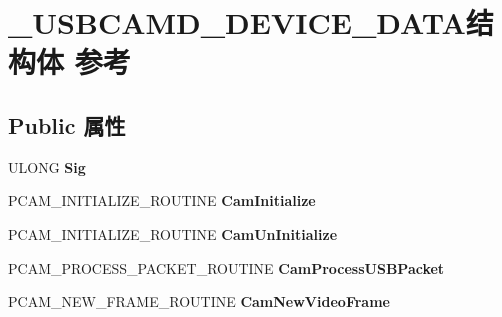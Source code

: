\hypertarget{struct___u_s_b_c_a_m_d___d_e_v_i_c_e___d_a_t_a}{}\section{\+\_\+\+U\+S\+B\+C\+A\+M\+D\+\_\+\+D\+E\+V\+I\+C\+E\+\_\+\+D\+A\+T\+A结构体 参考}
\label{struct___u_s_b_c_a_m_d___d_e_v_i_c_e___d_a_t_a}
\subsection*{Public 属性}
\begin{DoxyCompactItemize}
\item 
\mbox{\label{struct___u_s_b_c_a_m_d___d_e_v_i_c_e___d_a_t_a_aad42b60c278b87e0b741a6c79d7a0b13}} 
U\+L\+O\+NG {\bfseries Sig}
\item 
\mbox{\label{struct___u_s_b_c_a_m_d___d_e_v_i_c_e___d_a_t_a_a4c8837782d59302dc170af1d920a8d0a}} 
P\+C\+A\+M\+\_\+\+I\+N\+I\+T\+I\+A\+L\+I\+Z\+E\+\_\+\+R\+O\+U\+T\+I\+NE {\bfseries Cam\+Initialize}
\item 
\mbox{\label{struct___u_s_b_c_a_m_d___d_e_v_i_c_e___d_a_t_a_ab67f0c5ec57bf6c60098b5e660c15bd0}} 
P\+C\+A\+M\+\_\+\+I\+N\+I\+T\+I\+A\+L\+I\+Z\+E\+\_\+\+R\+O\+U\+T\+I\+NE {\bfseries Cam\+Un\+Initialize}
\item 
\mbox{\label{struct___u_s_b_c_a_m_d___d_e_v_i_c_e___d_a_t_a_a64f3e81d96e901667cd2162cca9ab150}} 
P\+C\+A\+M\+\_\+\+P\+R\+O\+C\+E\+S\+S\+\_\+\+P\+A\+C\+K\+E\+T\+\_\+\+R\+O\+U\+T\+I\+NE {\bfseries Cam\+Process\+U\+S\+B\+Packet}
\item 
\mbox{\label{struct___u_s_b_c_a_m_d___d_e_v_i_c_e___d_a_t_a_a5b7f5963e0aa18a19a71b8bc8781af3c}} 
P\+C\+A\+M\+\_\+\+N\+E\+W\+\_\+\+F\+R\+A\+M\+E\+\_\+\+R\+O\+U\+T\+I\+NE {\bfseries Cam\+New\+Video\+Frame}
\item 
\mbox{\label{struct___u_s_b_c_a_m_d___d_e_v_i_c_e___d_a_t_a_a8615ceabf0eb177b00bd9b0d117bf8bf}} 

\end{DoxyCompactItemize}
